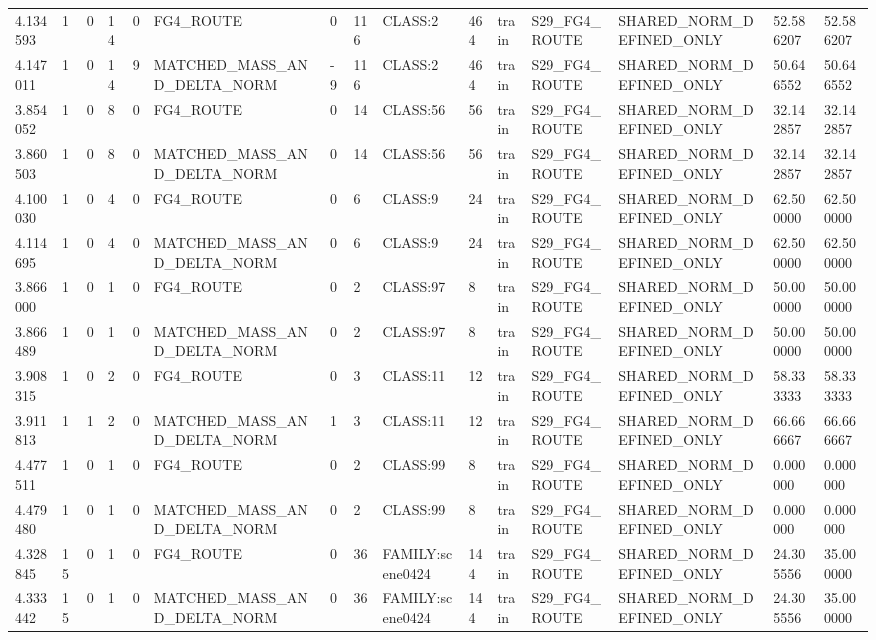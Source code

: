 \begin{tabular}{lllllllllllllll}
4.134593 & 1 & 0 & 14 & 0 & FG4\_ROUTE & 0 & 116 & CLASS:2 & 464 & train & S29\_FG4\_ROUTE & SHARED\_NORM\_DEFINED\_ONLY & 52.586207 & 52.586207 \\
4.147011 & 1 & 0 & 14 & 9 & MATCHED\_MASS\_AND\_DELTA\_NORM & -9 & 116 & CLASS:2 & 464 & train & S29\_FG4\_ROUTE & SHARED\_NORM\_DEFINED\_ONLY & 50.646552 & 50.646552 \\
3.854052 & 1 & 0 & 8 & 0 & FG4\_ROUTE & 0 & 14 & CLASS:56 & 56 & train & S29\_FG4\_ROUTE & SHARED\_NORM\_DEFINED\_ONLY & 32.142857 & 32.142857 \\
3.860503 & 1 & 0 & 8 & 0 & MATCHED\_MASS\_AND\_DELTA\_NORM & 0 & 14 & CLASS:56 & 56 & train & S29\_FG4\_ROUTE & SHARED\_NORM\_DEFINED\_ONLY & 32.142857 & 32.142857 \\
4.100030 & 1 & 0 & 4 & 0 & FG4\_ROUTE & 0 & 6 & CLASS:9 & 24 & train & S29\_FG4\_ROUTE & SHARED\_NORM\_DEFINED\_ONLY & 62.500000 & 62.500000 \\
4.114695 & 1 & 0 & 4 & 0 & MATCHED\_MASS\_AND\_DELTA\_NORM & 0 & 6 & CLASS:9 & 24 & train & S29\_FG4\_ROUTE & SHARED\_NORM\_DEFINED\_ONLY & 62.500000 & 62.500000 \\
3.866000 & 1 & 0 & 1 & 0 & FG4\_ROUTE & 0 & 2 & CLASS:97 & 8 & train & S29\_FG4\_ROUTE & SHARED\_NORM\_DEFINED\_ONLY & 50.000000 & 50.000000 \\
3.866489 & 1 & 0 & 1 & 0 & MATCHED\_MASS\_AND\_DELTA\_NORM & 0 & 2 & CLASS:97 & 8 & train & S29\_FG4\_ROUTE & SHARED\_NORM\_DEFINED\_ONLY & 50.000000 & 50.000000 \\
3.908315 & 1 & 0 & 2 & 0 & FG4\_ROUTE & 0 & 3 & CLASS:11 & 12 & train & S29\_FG4\_ROUTE & SHARED\_NORM\_DEFINED\_ONLY & 58.333333 & 58.333333 \\
3.911813 & 1 & 1 & 2 & 0 & MATCHED\_MASS\_AND\_DELTA\_NORM & 1 & 3 & CLASS:11 & 12 & train & S29\_FG4\_ROUTE & SHARED\_NORM\_DEFINED\_ONLY & 66.666667 & 66.666667 \\
4.477511 & 1 & 0 & 1 & 0 & FG4\_ROUTE & 0 & 2 & CLASS:99 & 8 & train & S29\_FG4\_ROUTE & SHARED\_NORM\_DEFINED\_ONLY & 0.000000 & 0.000000 \\
4.479480 & 1 & 0 & 1 & 0 & MATCHED\_MASS\_AND\_DELTA\_NORM & 0 & 2 & CLASS:99 & 8 & train & S29\_FG4\_ROUTE & SHARED\_NORM\_DEFINED\_ONLY & 0.000000 & 0.000000 \\
4.328845 & 15 & 0 & 1 & 0 & FG4\_ROUTE & 0 & 36 & FAMILY:scene0424 & 144 & train & S29\_FG4\_ROUTE & SHARED\_NORM\_DEFINED\_ONLY & 24.305556 & 35.000000 \\
4.333442 & 15 & 0 & 1 & 0 & MATCHED\_MASS\_AND\_DELTA\_NORM & 0 & 36 & FAMILY:scene0424 & 144 & train & S29\_FG4\_ROUTE & SHARED\_NORM\_DEFINED\_ONLY & 24.305556 & 35.000000 \\

\end{tabular}
